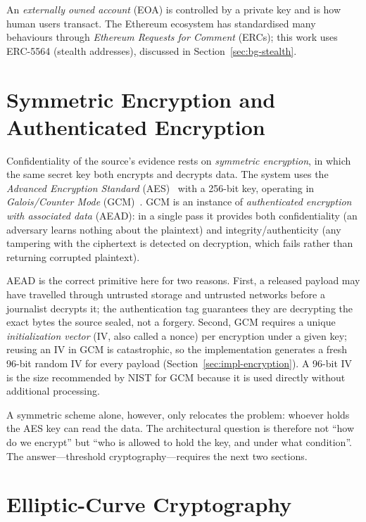 An \emph{externally owned account} (EOA) is controlled by a private key and is
how human users transact. The Ethereum ecosystem has standardised many
behaviours through \emph{Ethereum Requests for Comment} (ERCs); this work uses
ERC-5564 (stealth addresses), discussed in Section~\ref{sec:bg-stealth}.

\section{Symmetric Encryption and Authenticated Encryption}
\label{sec:bg-aead}

Confidentiality of the source's evidence rests on \emph{symmetric encryption}, in
which the same secret key both encrypts and decrypts data. The system uses the
\emph{Advanced Encryption Standard} (AES)~\cite{nistAES} with a 256-bit key,
operating in \emph{Galois/Counter Mode} (GCM)~\cite{nistGCM}. GCM is an instance
of \emph{authenticated encryption with associated data} (AEAD): in a single pass
it provides both confidentiality (an adversary learns nothing about the
plaintext) and integrity/authenticity (any tampering with the ciphertext is
detected on decryption, which fails rather than returning corrupted plaintext).

AEAD is the correct primitive here for two reasons. First, a released payload may
have travelled through untrusted storage and untrusted networks before a
journalist decrypts it; the authentication tag guarantees they are decrypting the
exact bytes the source sealed, not a forgery. Second, GCM requires a unique
\emph{initialization vector} (IV, also called a nonce) per encryption under a
given key; reusing an IV in GCM is catastrophic, so the implementation generates
a fresh 96-bit random IV for every payload (Section~\ref{sec:impl-encryption}).
A 96-bit IV is the size recommended by NIST for GCM because it is used directly
without additional processing.

A symmetric scheme alone, however, only relocates the problem: whoever holds the
AES key can read the data. The architectural question is therefore not ``how do
we encrypt'' but ``who is allowed to hold the key, and under what condition''.
The answer---threshold cryptography---requires the next two sections.

\section{Elliptic-Curve Cryptography}
\label{sec:bg-ecc}

